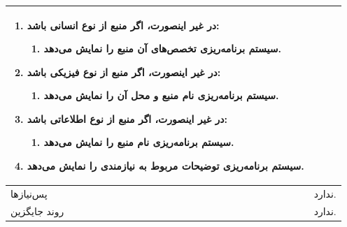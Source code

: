 \begin{table}[H]
\begin{tabular}{|p{3cm}|p{10cm}|}
\begin{enumerate}[topsep=0cm,leftmargin=0.5cm]
\begin{enumerate}[topsep=0cm,leftmargin=0.5cm]
				\item در غیر اینصورت، اگر منبع از نوع انسانی باشد:
				\begin{enumerate}[topsep=0cm,leftmargin=0.5cm]
					\item سیستم برنامه‌ریزی تخصص‌های آن منبع را نمایش می‌دهد.
				\end{enumerate}
				\item در غیر اینصورت، اگر منبع از نوع فیزیکی باشد:
				\begin{enumerate}[topsep=0cm,leftmargin=0.5cm]
					\item سیستم برنامه‌ریزی نام منبع و محل آن را نمایش می‌دهد.
				\end{enumerate}
				\item در غیر اینصورت، اگر منبع از نوع اطلاعاتی باشد:
				\begin{enumerate}[topsep=0cm,leftmargin=0.5cm]
					\item سیستم برنامه‌ریزی نام منبع را نمایش می‌دهد.
				\end{enumerate}	
				\item سیستم برنامه‌ریزی توضیحات مربوط به نیازمندی را نمایش می‌دهد.
			\end{enumerate}
			
		\end{enumerate} \\
		
		\hline
		پس‌نیازها & ندارد. \\
		\hline
		روند جایگزین & ندارد. \\
		\hline
	\end{tabular}
\end{table}

